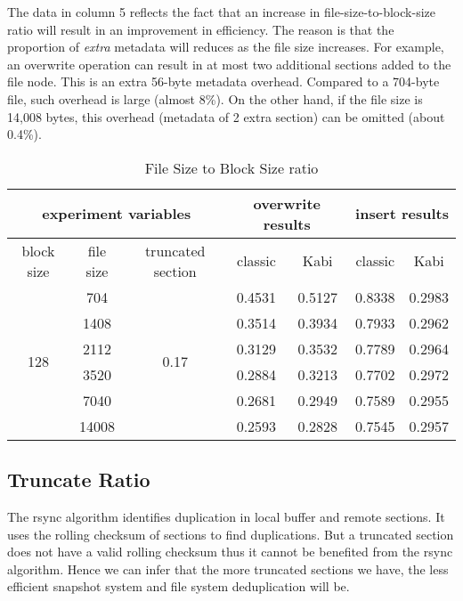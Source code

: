     The data in column 5 reflects the fact that an increase in file-size-to-block-size ratio will result in an improvement in efficiency. The reason is that the proportion of \emph{extra} metadata will reduces as the file size increases. For example, an overwrite operation can result in at most two additional sections added to the file node. This is an extra 56-byte metadata overhead. Compared to a 704-byte file, such overhead is large (almost 8\%). On the other hand, if the file size is 14,008 bytes, this overhead (metadata of 2 extra section) can be omitted (about 0.4\%).

\begin{table}[t]
\caption{File Size to Block Size ratio}
\label{tab:fb_ratio}
\begin{center}
\begin{tabular}{|c|c|c|cccc|}
\hline
\multicolumn{3}{|c|}{experiment variables} & \multicolumn{2}{c|}{overwrite results} & \multicolumn{2}{c|}{insert results}\\
\hline
block size & file size & truncated section & \multicolumn{1}{c|}{classic} & \multicolumn{1}{c|}{Kabi} & \multicolumn{1}{c|}{classic} & Kabi\\
\hline
\multirow{6}{*}{128} & 704 & \multirow{6}{*}{0.17} & 0.4531 & 0.5127 & 0.8338 & 0.2983 \\
& 1408 & & 0.3514 & 0.3934 & 0.7933 & 0.2962 \\
& 2112 & & 0.3129 & 0.3532 & 0.7789 & 0.2964 \\
& 3520 & & 0.2884 & 0.3213 & 0.7702 & 0.2972 \\
& 7040 & & 0.2681 & 0.2949 & 0.7589 & 0.2955 \\
& 14008 & & 0.2593 & 0.2828 & 0.7545 & 0.2957 \\
\hline
\end{tabular}
\end{center}
\end{table}

\subsection{Truncate Ratio}

    The rsync algorithm identifies duplication in local buffer and remote sections. It uses the rolling checksum of sections to find duplications. But a truncated section does not have a valid rolling checksum thus it cannot be benefited from the rsync algorithm. Hence we can infer that the more truncated sections we have, the less efficient snapshot system and file system deduplication will be.

